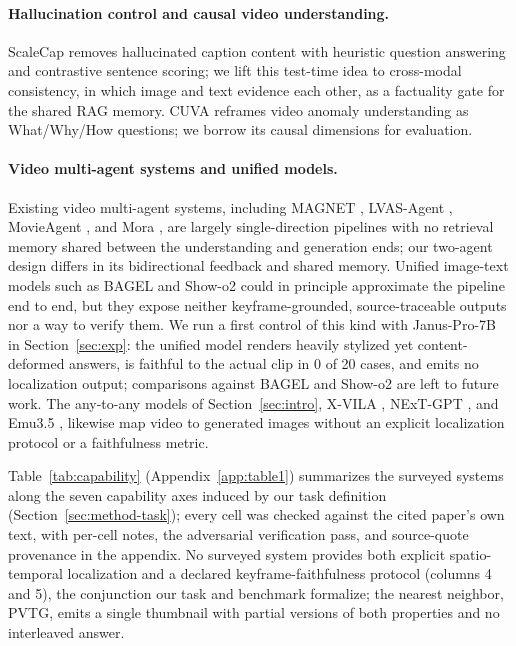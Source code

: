 \documentclass[10pt]{article}
\begin{document}
\paragraph{Hallucination control and causal video understanding.}
ScaleCap \citep{scalecap2506} removes hallucinated caption content with heuristic question answering and contrastive sentence scoring; we lift this test-time idea to cross-modal consistency, in which image and text evidence each other, as a factuality gate for the shared RAG memory. CUVA \citep{cuva2405} reframes video anomaly understanding as What/Why/How questions; we borrow its causal dimensions for evaluation.

\paragraph{Video multi-agent systems and unified models.}
Existing video multi-agent systems, including MAGNET \citep{magnet2506}, LVAS-Agent \citep{lvasagent2503}, MovieAgent \citep{movieagent2503}, and Mora \citep{mora2403}, are largely single-direction pipelines with no retrieval memory shared between the understanding and generation ends; our two-agent design differs in its bidirectional feedback and shared memory. Unified image-text models such as BAGEL \citep{bagel2505} and Show-o2 \citep{showo22506} could in principle approximate the pipeline end to end, but they expose neither keyframe-grounded, source-traceable outputs nor a way to verify them. We run a first control of this kind with Janus-Pro-7B \citep{januspro2501} in Section~\ref{sec:exp}: the unified model renders heavily stylized yet content-deformed answers, is faithful to the actual clip in 0 of 20 cases, and emits no localization output; comparisons against BAGEL and Show-o2 are left to future work. The any-to-any models of Section~\ref{sec:intro}, X-VILA \citep{xvila2405}, NExT-GPT \citep{nextgpt2309}, and Emu3.5 \citep{emu352510}, likewise map video to generated images without an explicit localization protocol or a faithfulness metric.

Table~\ref{tab:capability} (Appendix~\ref{app:table1}) summarizes the surveyed systems along the seven capability axes induced by our task definition (Section~\ref{sec:method-task}); every cell was checked against the cited paper's own text, with per-cell notes, the adversarial verification pass, and source-quote provenance in the appendix. No surveyed system provides both explicit spatio-temporal localization and a declared keyframe-faithfulness protocol (columns 4 and 5), the conjunction our task and benchmark formalize; the nearest neighbor, PVTG, emits a single thumbnail with partial versions of both properties and no interleaved answer.
\end{document}
